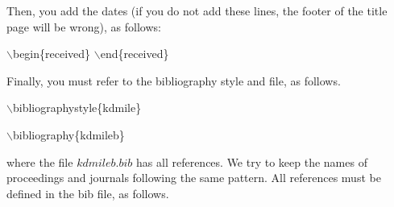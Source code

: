 \documentclass[kdmile,a4paper]{kdmile} %
\newenvironment{latexcode}
{\ttfamily\vspace{0.1in}\setlength{\parindent}{18pt}}
{\vspace{0.1in}}
\begin{document}
Then, you add the dates (if you do not add these lines, the footer of the title page will be wrong), as follows:

\begin{latexcode}
	$\backslash$begin\{received\}
	$\backslash$end\{received\}
\end{latexcode}

Finally, you must refer to the bibliography style and file, as follows.

	\begin{latexcode}
		$\backslash$bibliographystyle\{kdmile\}

		$\backslash$bibliography\{kdmileb\}
	\end{latexcode}

\noindent where the file $kdmileb.bib$ has all references. We try to keep the names of proceedings and journals following the same pattern. All references must be defined in the bib file, as follows. 
\end{document}
